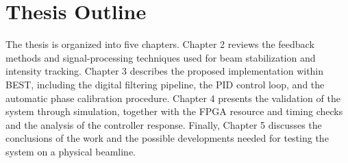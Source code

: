 \section{Thesis Outline}

The thesis is organized into five chapters. Chapter 2 reviews the feedback methods and signal-processing techniques used for beam stabilization and intensity tracking. Chapter 3 describes the proposed implementation within BEST, including the digital filtering pipeline, the PID control loop, and the automatic phase calibration procedure. Chapter 4 presents the validation of the system through simulation, together with the FPGA resource and timing checks and the analysis of the controller response. Finally, Chapter 5 discusses the conclusions of the work and the possible developments needed for testing the system on a physical beamline.

\newpage